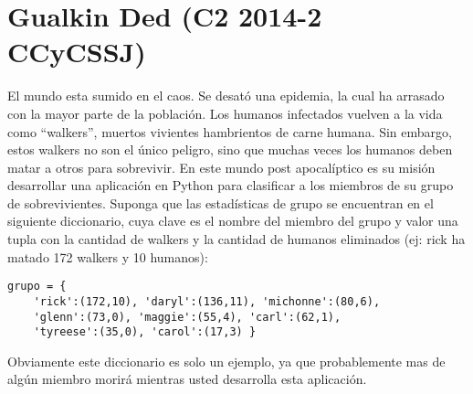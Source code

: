\section{Gualkin Ded (C2 2014-2 CCyCSSJ)}

El mundo esta sumido en el caos. Se desató una epidemia, la cual ha arrasado con la mayor parte de la población. Los humanos infectados vuelven a la vida como “walkers”, muertos vivientes hambrientos de carne humana. Sin embargo, estos walkers no son el único peligro, sino que muchas veces los humanos deben matar a otros para sobrevivir. En este mundo post apocalíptico es su misión desarrollar una aplicación en Python para clasificar a los miembros de su grupo de sobrevivientes. Suponga que las estadísticas de grupo se encuentran en el siguiente
diccionario, cuya clave es el nombre del miembro del grupo y valor una tupla con la cantidad de walkers y la cantidad de humanos eliminados (ej: rick ha matado 172 walkers y 10 humanos):

\begin{lstlisting}[style=consola]
grupo = {
    'rick':(172,10), 'daryl':(136,11), 'michonne':(80,6),
    'glenn':(73,0), 'maggie':(55,4), 'carl':(62,1),
    'tyreese':(35,0), 'carol':(17,3) }
\end{lstlisting}

Obviamente este diccionario es solo un ejemplo, ya que probablemente mas de algún miembro morirá mientras usted desarrolla esta aplicación. 

